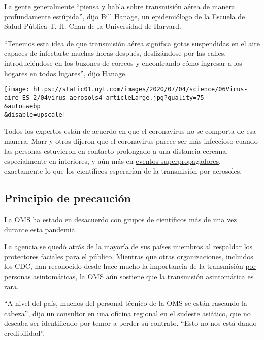 La gente generalmente ``piensa y habla sobre transmisión aérea de manera
profundamente estúpida'', dijo Bill Hanage, un epidemiólogo de la
Escuela de Salud Pública T. H. Chan de la Universidad de Harvard.

``Tenemos esta idea de que transmisión aérea significa gotas suspendidas
en el aire capaces de infectarte muchas horas después, deslizándose por
las calles, introduciéndose en los buzones de correos y encontrando cómo
ingresar a los hogares en todos lugares'', dijo Hanage.

\texttt{[image: https://static01.nyt.com/images/2020/07/04/science/06Virus-aire-ES-2/04virus-aerosols4-articleLarge.jpg?quality=75\\\&auto=webp\\\&disable=upscale]}

Todos los expertos están de acuerdo en que el coronavirus no se comporta
de esa manera. Marr y otros dijeron que el coronavirus parece ser más
infeccioso cuando las personas estuvieron en contacto prolongado a una
distancia cercana, especialmente en interiores, y aún más en
\href{https://www.nytimes.com/es/2020/07/03/espanol/el-misterio-de-los-superpropagadores-de-coronavirus.html}{eventos
superpropagadores}, exactamente lo que los científicos esperarían de la
transmisión por aerosoles.

\hypertarget{principio-de-precauciuxf3n}{%
\subsection{Principio de precaución}\label{principio-de-precauciuxf3n}}

La OMS ha estado en desacuerdo con grupos de científicos más de una vez
durante esta pandemia.

La agencia se quedó atrás de la mayoría de sus países miembros al
\href{https://www.nytimes.com/2020/06/05/health/coronavirus-masks-who.html}{respaldar
los protectores faciales} para el público. Mientras que otras
organizaciones, incluidos los CDC, han reconocido desde hace mucho la
importancia de la transmisión
\href{https://www.nytimes.com/es/2020/06/29/espanol/mundo/coronavirus-asintomaticos.html}{por
personas asintomáticas}, la OMS aún
\href{https://www.nytimes.com/2020/06/09/health/coronavirus-asymptomatic-world-health-organization.html}{sostiene
que la transmisión asintomática es rara}.

``A nivel del país, muchos del personal técnico de la OMS se están
rascando la cabeza'', dijo un consultor en una oficina regional en el
sudeste asiático, que no deseaba ser identificado por temor a perder su
contrato. ``Esto no nos está dando credibilidad''.

